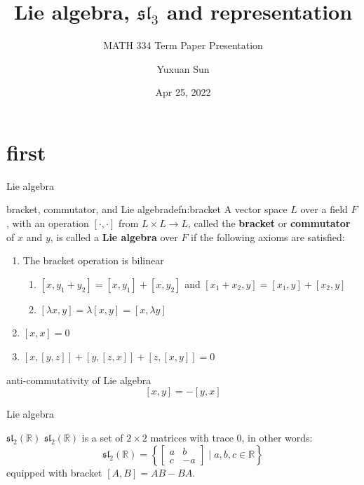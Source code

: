 \documentclass{beamer}
\title{Lie algebra, $\mathfrak{sl}_3$ and representation}
\subtitle{MATH 334 Term Paper Presentation}
\date{Apr 25, 2022}
\author{Yuxuan Sun}
\institute{Haverford College}
\newcommand{\R}{\mathbb{R}}
\begin{document}
	
\begin{frame}
\titlepage
\end{frame}

\section{first}

\begin{frame}{Lie algebra}

	\begin{defn}{bracket, commutator, and Lie algebra}{defn:bracket}
	A vector space $L$ over a field $F$, with an operation $\left[ \cdot, \cdot \right] $ from $L \times L \to  L$, called the  \textbf{bracket} or \textbf{commutator} of $x$ and  $y$, is called a  \textbf{Lie algebra} over $F$ if the following axioms are satisfied:
\begin{enumerate}
		 \item The bracket operation is bilinear
\begin{enumerate}
	\item $[x,y_1+y_2] = [x,y_1] + [x,y_2]$ and $[x_1+x_2,y] = [x_1,y] + [x_2,y]$
	\item $[\lambda x, y] = \lambda[x,y] = [x, \lambda y]$
\end{enumerate}
		 \item $[x,x] = 0$
		 \item $[x,[y,z]]+[y,[z,x]] +[z,[x,y]] = 0$
	\end{enumerate}
\end{defn}
\begin{theom}{anti-commutativity of Lie algebra}{}
		\[
			[x,y] = -[y,x]
		\] 
\end{theom}	

\end{frame}

\begin{frame}{Lie algebra}
	\begin{exm}{$\mathfrak{sl}_2(\R)$}{}
		$\mathfrak{sl}_2(\R)$ is a set of  $2 \times 2$ matrices with trace  $0$, in other words:
	\[
		\mathfrak{sl}_2(\R) = \left\{ \begin{bmatrix} a & b \\ c & -a \end{bmatrix} \mid a,b,c \in \R  \right\} 
	\] equipped with bracket $[A,B] = AB - BA$.
\end{exm}
\end{frame}
\end{document}
